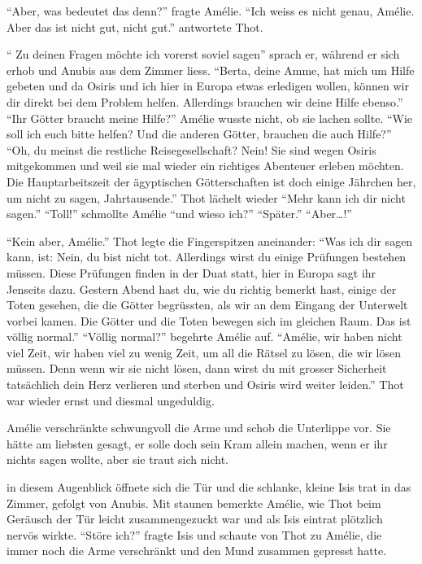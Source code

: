\documentclass[11pt,titlepage,a5paper]{book}
\begin{document}
"`Aber, was bedeutet das denn?"' fragte Amélie. "`Ich weiss es nicht genau, Amélie. Aber das ist nicht gut, nicht gut."' antwortete Thot. 
 
"` Zu deinen Fragen möchte ich vorerst soviel sagen"' sprach er, während er sich erhob und Anubis aus dem Zimmer liess. "`Berta, deine Amme, hat mich um Hilfe gebeten und da Osiris und ich hier in Europa etwas erledigen wollen, können wir dir direkt bei dem Problem helfen. Allerdings brauchen wir deine Hilfe ebenso."' "`Ihr Götter braucht meine Hilfe?"' Amélie wusste nicht, ob sie lachen sollte. "`Wie soll ich euch bitte helfen? Und die anderen Götter, brauchen die auch Hilfe?"' "`Oh, du meinst die restliche Reisegesellschaft? Nein! Sie sind wegen Osiris mitgekommen und weil sie mal wieder ein richtiges Abenteuer erleben möchten. Die Hauptarbeitszeit der ägyptischen Götterschaften ist doch einige Jährchen her, um nicht zu sagen, Jahrtausende."' Thot lächelt wieder "`Mehr kann ich dir nicht sagen."' "`Toll!"' schmollte Amélie "`und wieso ich?"' "`Später."' "`Aber\dots!"'

"`Kein aber, Amélie."' Thot legte die Fingerspitzen aneinander: "`Was ich dir sagen kann, ist: Nein, du bist nicht tot. Allerdings wirst du einige Prüfungen bestehen müssen. Diese Prüfungen finden in der Duat statt, hier in Europa sagt ihr Jenseits dazu. Gestern Abend hast du, wie du richtig bemerkt hast, einige der Toten gesehen, die die Götter begrüssten, als wir an dem Eingang der Unterwelt vorbei kamen. Die Götter und die Toten bewegen sich im gleichen Raum. Das ist völlig normal."' "`Völlig normal?"' begehrte Amélie auf. "`Amélie, wir haben nicht viel Zeit, wir haben viel zu wenig Zeit, um all die Rätsel zu lösen, die wir lösen müssen. Denn wenn wir sie nicht lösen, dann wirst du mit grosser Sicherheit tatsächlich dein Herz verlieren und sterben und Osiris wird weiter leiden."' Thot war wieder ernst und diesmal ungeduldig.

Amélie verschränkte schwungvoll die Arme und schob die Unterlippe vor. Sie hätte am liebsten gesagt, er solle doch sein Kram allein machen, wenn er ihr nichts sagen wollte, aber sie traut sich nicht.

in diesem Augenblick öffnete sich die Tür und die schlanke, kleine Isis trat in das Zimmer, gefolgt von Anubis. Mit staunen bemerkte Amélie, wie Thot beim Geräusch der Tür leicht zusammengezuckt war und als Isis eintrat plötzlich nervös wirkte. "`Störe ich?"' fragte Isis und schaute von Thot zu Amélie, die immer noch die Arme verschränkt und den Mund zusammen gepresst hatte.
\end{document}
